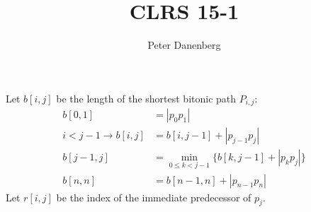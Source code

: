 \documentclass{article}
\title{CLRS 15-1}
\author{Peter Danenberg}
\begin{document}
\maketitle

Let $b[i, j]$ be the length of the shortest bitonic path $P_{i,j}$:
\begin{align}
  b[0,1] &= |p_0p_1|\\
  i < j - 1 \to b[i,j] &= b[i, j-1] + |p_{j-1}p_j|\\
  b[j-1,j] &= \min_{0\leq k<j-1}\{b[k,j-1]+|p_kp_j|\}\\
    b[n,n] &=b[n-1,n] +|p_{n-1}p_n|
\end{align}
Let $r[i,j]$ be the index of the immediate predecessor of $p_j$.
\end{document}
